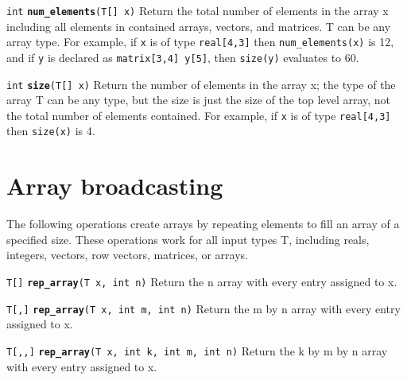 \documentclass[
  10pt,
]{book}
\begin{document}

\texttt{int} \textbf{\texttt{num\_elements}}\texttt{(T{[}{]}\ x)}\newline
Return the total number of elements in the array x including all
elements in contained arrays, vectors, and matrices. T can be any
array type. For example, if \texttt{x} is of type \texttt{real{[}4,3{]}} then
\texttt{num\_elements(x)} is 12, and if \texttt{y} is declared as \texttt{matrix{[}3,4{]}\ y{[}5{]}},
then \texttt{size(y)} evaluates to 60.


\texttt{int} \textbf{\texttt{size}}\texttt{(T{[}{]}\ x)}\newline
Return the number of elements in the array x; the type of the array T
can be any type, but the size is just the size of the top level array,
not the total number of elements contained. For example, if \texttt{x} is of
type \texttt{real{[}4,3{]}} then \texttt{size(x)} is 4.

\hypertarget{array-broadcasting}{%
\section{Array broadcasting}\label{array-broadcasting}}

The following operations create arrays by repeating elements to fill
an array of a specified size. These operations work for all input
types T, including reals, integers, vectors, row vectors, matrices, or
arrays.


\texttt{T{[}{]}} \textbf{\texttt{rep\_array}}\texttt{(T\ x,\ int\ n)}\newline
Return the n array with every entry assigned to x.


\texttt{T{[},{]}} \textbf{\texttt{rep\_array}}\texttt{(T\ x,\ int\ m,\ int\ n)}\newline
Return the m by n array with every entry assigned to x.


\texttt{T{[},,{]}} \textbf{\texttt{rep\_array}}\texttt{(T\ x,\ int\ k,\ int\ m,\ int\ n)}\newline
Return the k by m by n array with every entry assigned to x.
\end{document}
